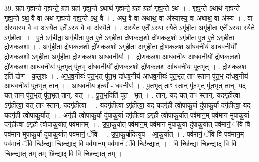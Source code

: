 \documentclass[17pt]{extarticle}
\begin{document}
39. ग्रहा॑ गृह्यन्ते गृह्यन्ते॒ ग्रहा॒ ग्रहा॑ गृह्य॒न्ते ऽथाथ॑ गृह्यन्ते॒ ग्रहा॒ ग्रहा॑ गृह्य॒न्ते ऽथ॑ । . गृ॒ह्य॒न्ते ऽथाथ॑ गृह्यन्ते गृह्य॒न्ते ऽथ॒ वै वा अथ॑ गृह्यन्ते गृह्य॒न्ते ऽथ॒ वै । . अथ॒ वै वा अथाथ॒ वा अ॑स्यास्य॒ वा अथाथ॒ वा अ॑स्य । . वा अ॑स्यास्य॒ वै वा अ॑स्यै॒त ए॒ते᳚ ऽस्य॒ वै वा अ॑स्यै॒ते । . अ॒स्यै॒त ए॒ते᳚ ऽस्या स्यै॒ते ऽगृ॑हीता॒ अगृ॑हीता ए॒ते᳚ ऽस्या स्यै॒ते ऽगृ॑हीताः । . ए॒ते ऽगृ॑हीता॒ अगृ॑हीता ए॒त ए॒ते ऽगृ॑हीता द्रोणकल॒शो द्रो॑णकल॒शो ऽगृ॑हीता ए॒त ए॒ते ऽगृ॑हीता द्रोणकल॒शः । . अगृ॑हीता द्रोणकल॒शो द्रो॑णकल॒शो ऽगृ॑हीता॒ अगृ॑हीता द्रोणकल॒श आ॑धव॒नीय॑ आधव॒नीयो᳚ द्रोणकल॒शो ऽगृ॑हीता॒ अगृ॑हीता द्रोणकल॒श आ॑धव॒नीयः॑ । . द्रो॒ण॒क॒ल॒श आ॑धव॒नीय॑ आधव॒नीयो᳚ द्रोणकल॒शो द्रो॑णकल॒श आ॑धव॒नीयः॑ पूत॒भृत् पू॑त॒भृ दा॑धव॒नीयो᳚ द्रोणकल॒शो द्रो॑णकल॒श आ॑धव॒नीयः॑ पूत॒भृत् । . द्रो॒ण॒क॒ल॒श इति॑ द्रोण - क॒ल॒शः । . आ॒ध॒व॒नीयः॑ पूत॒भृत् पू॑त॒भृ दा॑धव॒नीय॑ आधव॒नीयः॑ पूत॒भृत् ताꣳ स्तान् पू॑त॒भृ दा॑धव॒नीय॑ आधव॒नीयः॑ पूत॒भृत् तान् । . आ॒ध॒व॒नीय॒ इत्या᳚ - ध॒व॒नीयः॑ । . पू॒त॒भृत् ताꣳ स्तान् पू॑त॒भृत् पू॑त॒भृत् तान्. यद् यत् तान् पू॑त॒भृत् पू॑त॒भृत् तान्. यत् । . पू॒त॒भृदिति॑ पूत - भृत् । . तान्. यद् यत् ताꣳ स्तान्. यदगृ॑ही॒त्वा ऽगृ॑हीत्वा॒ यत् ताꣳ स्तान्. यदगृ॑हीत्वा । . यदगृ॑ही॒त्वा ऽगृ॑हीत्वा॒ यद् यदगृ॑ही त्वोपाकु॒र्या दु॑पाकु॒र्या दगृ॑हीत्वा॒ यद् यदगृ॑ही त्वोपाकु॒र्यात् । . अगृ॑ही त्वोपाकु॒र्या दु॑पाकु॒र्या दगृ॑ही॒त्वा ऽगृ॑ही त्वोपाकु॒र्यात् पव॑मान॒म् पव॑मान मुपाकु॒र्या दगृ॑ही॒त्वा ऽगृ॑ही त्वोपाकु॒र्यात् पव॑मानम् । . उ॒पा॒कु॒र्यात् पव॑मान॒म् पव॑मान मुपाकु॒र्या दु॑पाकु॒र्यात् पव॑मानं॒ ॅवि वि पव॑मान मुपाकु॒र्या दु॑पाकु॒र्यात् पव॑मानं॒ ॅवि । . उ॒पा॒कु॒र्यादित्यु॑प - आ॒कु॒र्यात् । . पव॑मानं॒ ॅवि वि पव॑मान॒म् पव॑मानं॒ ॅवि च्छि॑न्द्या च्छिन्द्या॒द् वि पव॑मान॒म् पव॑मानं॒ 
ॅवि च्छि॑न्द्यात् । . वि च्छि॑न्द्या च्छिन्द्या॒द् वि वि च्छि॑न्द्या॒त् तम् तम् छि॑न्द्या॒द् वि वि च्छि॑न्द्या॒त् तम् । \newline
\pagebreak
{}
\end{document}
